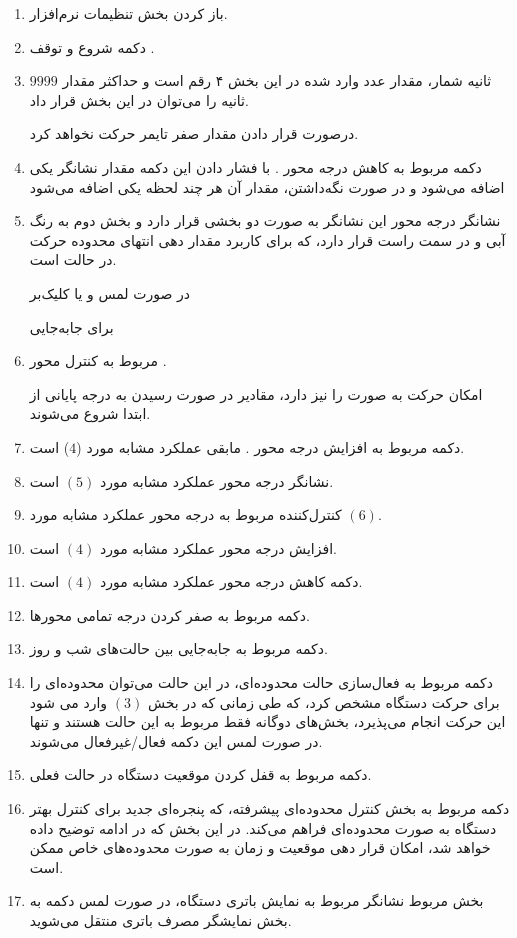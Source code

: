 \documentclass[a4paper,12pt]{report}
\begin{document}
	\begin{enumerate}[nosep]
		\item
			باز کردن بخش تنظیمات نرم‌افزار.
		\item%
			دکمه شروع و توقف
			.

		\item
			ثانیه شمار، مقدار عدد وارد شده در این بخش ۴ رقم است و حداکثر مقدار
			$9999$
			ثانیه را می‌توان در این بخش قرار داد.

			درصورت قرار دادن مقدار صفر تایمر حرکت نخواهد کرد.
		\item%
			دکمه مربوط به کاهش درجه محور
			.
			با فشار دادن این دکمه مقدار نشانگر یکی اضافه می‌شود و در صورت نگه‌داشتن، مقدار آن هر چند لحظه یکی اضافه می‌شود

		\item
		نشانگر درجه محور
		این نشانگر به صورت دو بخشی قرار دارد و بخش دوم به رنگ آبی و در سمت راست قرار دارد، که برای کاربرد مقدار دهی انتهای محدوده حرکت در حالت
		است.

		در صورت لمس و یا کلیک‌بر

		برای جابه‌جایی

		\item%
			مربوط به کنترل محور
			.

			امکان حرکت به صورت
			را نیز دارد، مقادیر در صورت رسیدن به درجه پایانی از ابتدا شروع می‌شوند.
		\item

			دکمه مربوط به افزایش درجه محور
			.
			مابقی عملکرد مشابه مورد
			($ 4 $)
			است.
		\item%
			نشانگر درجه محور
			عملکرد مشابه مورد
			$ (5) $
			است.
		\item
			کنترل‌کننده مربوط به درجه محور
			عملکرد مشابه مورد
			$ (6) $.
		\item%
			افزایش درجه محور
			عملکرد مشابه مورد
			$ (4) $
			است.
		\item
			دکمه کاهش درجه محور
			عملکرد مشابه مورد
			$ (4) $
			است.
		\item%
			دکمه مربوط به صفر کردن درجه تمامی محور‌ها.
		\item
			دکمه مربوط به جابه‌جایی بین حالت‌های شب و روز.
		\item%
			دکمه مربوط به فعال‌سازی حالت محدوده‌ای، در این حالت می‌توان محدوده‌ای را برای حرکت دستگاه مشخص کرد، که طی زمانی که در بخش
			$ (3) $
			وارد می شود این حرکت انجام می‌پذیرد، بخش‌های دوگانه فقط مربوط به این حالت هستند و تنها در صورت لمس این دکمه فعال/غیرفعال می‌شوند.
		\item
			دکمه مربوط به قفل کردن موقعیت دستگاه در حالت فعلی.
		\item%
			دکمه مربوط به بخش کنترل محدوده‌ای پیشرفته، که پنجره‌ای جدید برای کنترل بهتر دستگاه به صورت محدوده‌ای فراهم می‌کند. در این بخش که در ادامه توضیح داده خواهد شد، امکان قرار دهی موقعیت و زمان به صورت محدوده‌های خاص ممکن است.
		\item
			بخش مربوط نشانگر مربوط به نمایش باتری دستگاه، در صورت لمس دکمه به بخش نمایشگر مصرف باتری منتقل می‌شوید.


\end{enumerate}
\end{document}
